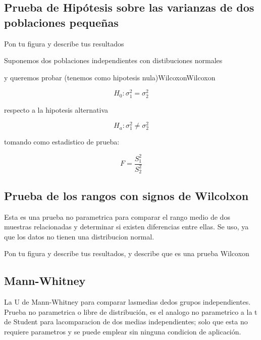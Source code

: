\subsection{Prueba de Hipótesis sobre las varianzas de dos poblaciones pequeñas} 
Pon tu figura y describe tus resultados


Suponemos dos poblaciones independientes con distibuciones normales  

y queremos probar (tenemos como hipotesis nula)WilcoxonWilcoxon

$$H_{0} : \sigma_{1}^{2} = \sigma_{2}^{2}$$

respecto a la hipotesis alternativa

$$H_{a} : \sigma_{1}^{2} \neq \sigma_{2}^{2}$$

tomando como estadistico de prueba:

$$ F = \frac{S_{1}^{2}}{S_{2}^{2}}$$



\subsection{Prueba de los rangos con signos de Wilcolxon}

Esta es una prueba no parametrica para comparar el rango medio de dos muestras relacionadas y determinar si existen diferencias entre ellas. Se uso, ya que los datos no tienen una distribucion normal.





Pon tu figura y describe tus resultados, y describe que es una prueba Wilcoxon


\subsection{Mann-Whitney}
La U de Mann-Whitney para comparar lasmedias dedos grupos independientes. 
Prueba no parametrica o libre de distribución, es el analogo no parametrico a la t de Student para lacomparacion de dos medias independientes; solo que esta no requiere parametros y se puede emplear sin ninguna condicion de aplicación.

